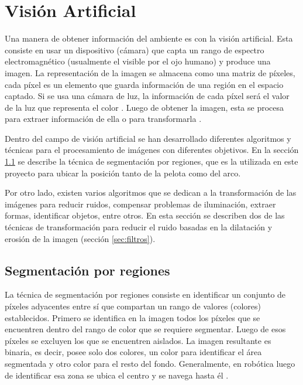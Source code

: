 \section{Visión Artificial} \label{sect:Vision_Artificial}

Una manera de obtener información del ambiente es con la visión artificial. Esta consiste en usar un dispositivo (cámara) que capta un rango de espectro electromagnético (usualmente el visible por el ojo humano) y produce una imagen. La representación de la imagen se almacena como una matriz de píxeles, cada píxel es un elemento que guarda información de una región en el espacio captado. Si se usa una cámara de luz, la información de cada píxel será el valor de la luz que representa el color . Luego de obtener la imagen, esta se procesa para extraer información de ella o para transformarla \cite{AiRobotics}.

Dentro del campo de visión artificial se han desarrollado diferentes algoritmos y t\'ecnicas para el procesamiento de imágenes con diferentes objetivos. En la sección \ref{sec:Segmentacion} se describe la t\'ecnica de segmentaci\'on por regiones, que es la utilizada en este proyecto para ubicar la posición tanto de la pelota como del arco. 

Por otro lado, existen varios algoritmos que se dedican a la transformación de las imágenes para reducir ruidos, compensar problemas de iluminación, extraer formas, identificar objetos, entre otros. En esta sección se describen dos de las técnicas de transformación para reducir el ruido basadas en la dilatación y erosión de la imagen (secci\'on \ref{sec:filtros}). 
 
\subsection{Segmentaci\'on por regiones}\label{sec:Segmentacion}

La técnica de segmentación por regiones consiste en identificar un conjunto de píxeles adyacentes entre sí que compartan un rango de valores (colores) establecidos. Primero se identifica en la imagen todos los píxeles que se encuentren dentro del rango de color que se requiere segmentar. Luego de esos píxeles se excluyen los que se encuentren aislados. La imagen resultante es binaria, es decir, posee solo dos colores, un color para identificar el área segmentada y otro color para el resto del fondo.
Generalmente, en robótica luego de identificar esa zona se ubica el centro y se navega hasta él \cite{AiRobotics}. 

